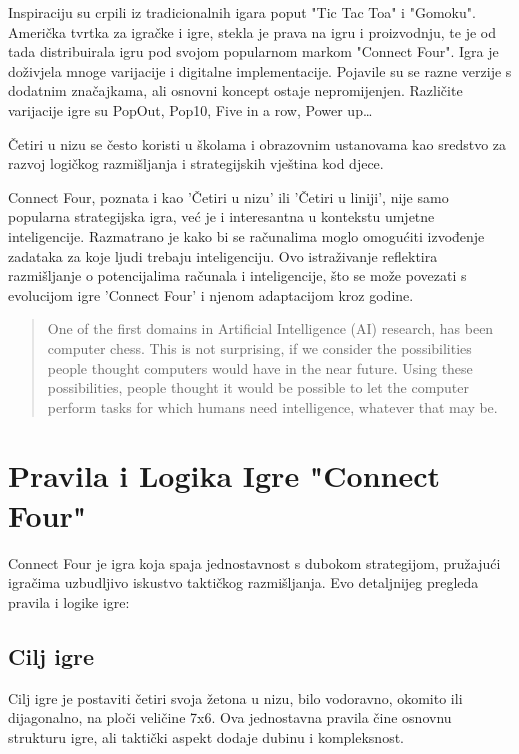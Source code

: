 \documentclass[]{foi}
\begin{document}
Inspiraciju su crpili iz tradicionalnih igara poput "Tic Tac Toa" i "Gomoku". Američka tvrtka za igračke i igre, stekla je prava na igru i proizvodnju, te je od tada distribuirala igru pod svojom popularnom markom "Connect Four". Igra je doživjela mnoge varijacije i digitalne implementacije. Pojavile su se razne verzije s dodatnim značajkama, ali osnovni koncept ostaje nepromijenjen.
Različite varijacije igre su PopOut, Pop10, Five in a row, Power up…

Četiri u nizu se često koristi u školama i obrazovnim ustanovama kao sredstvo za razvoj logičkog razmišljanja i strategijskih vještina kod djece.

Connect Four, poznata i kao 'Četiri u nizu' ili 'Četiri u liniji', nije samo popularna strategijska igra, već je i interesantna u kontekstu umjetne inteligencije. Razmatrano je kako bi se računalima moglo omogućiti izvođenje zadataka za koje ljudi trebaju inteligenciju. Ovo istraživanje reflektira razmišljanje o potencijalima računala i inteligencije, što se može povezati s evolucijom igre 'Connect Four' i njenom adaptacijom kroz godine.

\blockquote[{\cite[str. 5]{allis1988knowledge}}]{One of the first domains in Artificial Intelligence (AI) research, has been computer chess. This
is not surprising, if we consider the possibilities people thought computers would have in the near
future. Using these possibilities, people thought it would be possible to let the computer perform tasks
for which humans need intelligence, whatever that may be.}







\chapter{Pravila i Logika Igre "Connect Four"}

Connect Four je igra koja spaja jednostavnost s dubokom strategijom, pružajući igračima uzbudljivo iskustvo taktičkog razmišljanja. Evo detaljnijeg pregleda pravila i logike igre:

\section{Cilj igre}

Cilj igre je postaviti četiri svoja žetona u nizu, bilo vodoravno, okomito ili dijagonalno, na ploči veličine 7x6. Ova jednostavna pravila čine osnovnu strukturu igre, ali taktički aspekt dodaje dubinu i kompleksnost.
\end{document}
